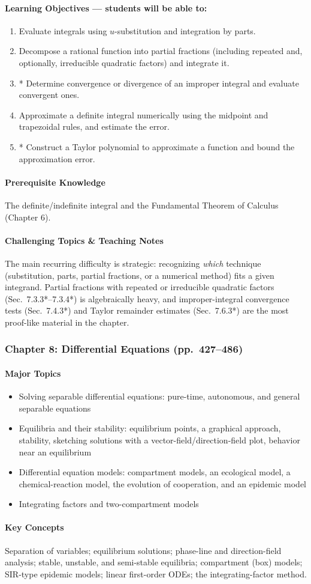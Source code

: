 \documentclass[11pt]{article}
\newcommand{\ChapHead}[2]{\subsubsection{#1 \textnormal{\normalfont\normalsize\color{lightgray}(pp.\ #2)}}}
\newcommand{\MajorTopics}{\paragraph{Major Topics}}
\newcommand{\KeyConcepts}{\paragraph{Key Concepts}}
\newcommand{\LearnObj}{\paragraph{Learning Objectives --- students will be able to:}}
\newcommand{\PreReq}{\paragraph{Prerequisite Knowledge}}
\newcommand{\Hard}{\paragraph{Challenging Topics \& Teaching Notes}}
\begin{document}
\LearnObj
\begin{enumerate}
\item Evaluate integrals using $u$-substitution and integration by parts.
\item Decompose a rational function into partial fractions (including repeated and, optionally, irreducible quadratic factors) and integrate it.
\item * Determine convergence or divergence of an improper integral and evaluate convergent ones.
\item Approximate a definite integral numerically using the midpoint and trapezoidal rules, and estimate the error.
\item * Construct a Taylor polynomial to approximate a function and bound the approximation error.
\end{enumerate}

\PreReq The definite/indefinite integral and the Fundamental Theorem of Calculus (Chapter 6).

\Hard The main recurring difficulty is strategic: recognizing \emph{which}
technique (substitution, parts, partial fractions, or a numerical method)
fits a given integrand. Partial fractions with repeated or irreducible
quadratic factors (Sec.\ 7.3.3*--7.3.4*) is algebraically heavy, and
improper-integral convergence tests (Sec.\ 7.4.3*) and Taylor remainder
estimates (Sec.\ 7.6.3*) are the most proof-like material in the chapter.

\bigskip
\ChapHead{Chapter 8: Differential Equations}{427--486}

\MajorTopics
\begin{itemize}
\item Solving separable differential equations: pure-time, autonomous, and general separable equations
\item Equilibria and their stability: equilibrium points, a graphical approach, stability, sketching solutions with a vector-field/direction-field plot, behavior near an equilibrium
\item Differential equation models: compartment models, an ecological model, a chemical-reaction model, the evolution of cooperation, and an epidemic model
\item Integrating factors and two-compartment models
\end{itemize}

\KeyConcepts
Separation of variables; equilibrium solutions; phase-line and
direction-field analysis; stable, unstable, and semi-stable equilibria;
compartment (box) models; SIR-type epidemic models; linear first-order
ODEs; the integrating-factor method.
\end{document}
